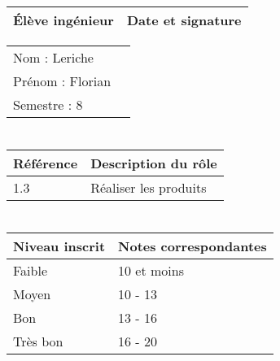\documentclass[11pt]{article}
\begin{document}

\begin{center}
\begin{table}[!hp]

	\begin{tabularx}{\linewidth}{|X|X|}
	\hline
	\rowcolor{gray!40} Élève ingénieur & Date et signature \\
	\hline
	\end{tabularx}
	\begin{tabularx}{\linewidth}{|X|X|}
	Nom : Leriche &  \\ 
	Prénom : Florian & \\
	Semestre : 8 & \\
	\hline
	\end{tabularx}
\end{table}
\end{center}

\section*{\large\FR}

\begin{table}[!hp]
\centering
	\begin{tabularx}{\linewidth}{|X|X|}
	\hline
	\rowcolor{gray!40} Référence \WBSCourt & Description du rôle \\
	\hline
	 1.3 & Réaliser les produits \\
	 \hline
	\end{tabularx}
\end{table}


\section*{\large\FC}


\begin{table}[!hp]
\centering
	\begin{tabularx}{\linewidth}{|X|X|}
	\hline
	\rowcolor{gray!40} Niveau inscrit & Notes correspondantes \\
	\hline
	 Faible & 10 et moins \\
	 \hline
	 Moyen & 10 - 13 \\
	 \hline
	 Bon & 13 - 16 \\
	 \hline
	 Très bon & 16 - 20 \\
	 \hline
	\end{tabularx}
\end{table}
\end{document}
